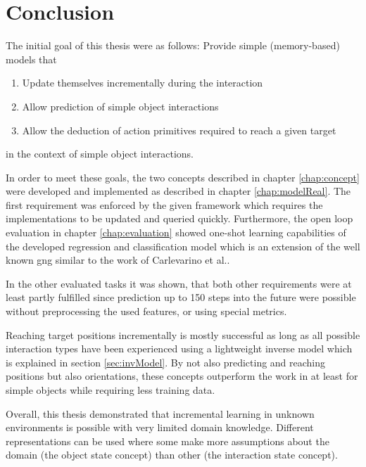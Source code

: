\chapter{Conclusion \label{chap:conclusion}}


The initial goal of this thesis were as follows:
Provide simple (memory-based) models that
\begin{enumerate}
\item Update themselves incrementally during the interaction
\item Allow prediction of simple object interactions
\item Allow the deduction of action primitives required to reach a given target
\end{enumerate}
in the context of simple object interactions.

In order to meet these goals, the two concepts described in chapter \ref{chap:concept} were developed and implemented as described in chapter \ref{chap:modelReal}. 
The first requirement was enforced by the given framework which requires the implementations to be updated and queried quickly. Furthermore, the open loop evaluation in chapter \ref{chap:evaluation} showed one-shot learning capabilities of the developed regression and classification model which is an extension of the well known \gls{gng} similar to the work of Carlevarino et al.\cite{carlevarino2000incremental}.

In the other evaluated tasks it was shown, that both other requirements were at least partly fulfilled since prediction up to 150 steps into the future were possible without preprocessing the used features, or using special metrics. 

Reaching target positions incrementally is mostly successful as long as all possible interaction types have been experienced using a lightweight inverse model which is explained in section \ref{sec:invModel}. By not also predicting and reaching positions but also orientations, these concepts outperform the work in \cite{pushing} at least for simple objects while requiring less training data. 

Overall, this thesis demonstrated that incremental learning in unknown environments is possible with very limited domain knowledge. Different representations can be used where some make more assumptions about the domain (the object state concept) than other (the interaction state concept).



